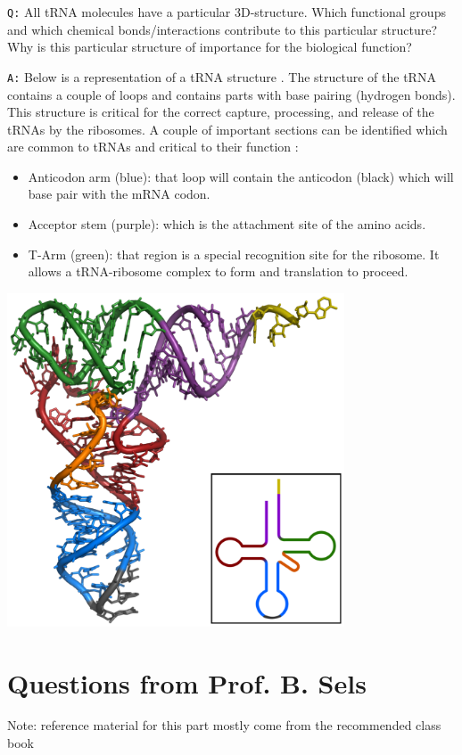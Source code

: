 \documentclass[11pt, a4paper,titlepage]{article}
\begin{document}
\texttt{Q:} All tRNA molecules have a particular 3D-structure. Which
functional groups and which chemical bonds/interactions contribute to
this particular structure? Why is this particular structure of
importance for the biological function?

\texttt{A:} Below is a representation of a tRNA structure
\cite{tRNA-Phe}. The structure of the tRNA contains a couple of loops
and contains parts with base pairing (hydrogen bonds). This structure
is critical for the correct capture, processing, and release of the
tRNAs by the ribosomes. A couple of important sections can be identified
which are common to tRNAs and critical to their function :

\begin{itemize}
\item Anticodon arm (blue): that loop will contain the anticodon (black)
  which will base pair with the mRNA codon.
\item Acceptor stem (purple): which is the attachment site of the amino
  acids.
\item T-Arm (green): that region is a special recognition site for the
  ribosome. It allows a tRNA-ribosome complex to form and translation
  to proceed.
\end{itemize}

\includegraphics[width=10cm]{./Figures/TRNA-Phe_yeast.png}
\section{Questions from Prof. B. Sels}
\label{sec-2}

Note: reference material for this part mostly come from the
recommended class book \cite{BioChemBlei}
\end{document}
